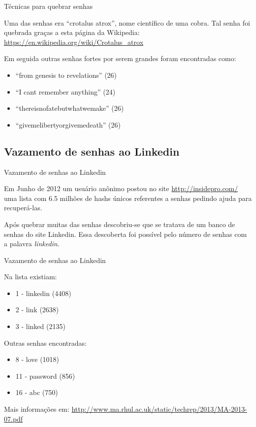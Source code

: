 \begin{frame}{Técnicas para quebrar senhas}

Uma das senhas era ``crotalus atrox'', nome científico de uma cobra. Tal
senha foi quebrada graças a esta página da Wikipedia:
\url{https://en.wikipedia.org/wiki/Crotalus_atrox}

Em seguida outras senhas fortes por serem grandes foram encontradas
como:

\begin{itemize}
\itemsep1pt\parskip0pt
\item
  ``from genesis to revelations'' (26)
\item
  ``I cant remember anything'' (24)
\item
  ``thereisnofatebutwhatwemake'' (26)
\item
  ``givemelibertyorgivemedeath'' (26)
\end{itemize}

\end{frame}

\subsection{Vazamento de senhas ao
Linkedin}\label{vazamento-de-senhas-ao-linkedin}

\begin{frame}{Vazamento de senhas ao Linkedin}

Em Junho de 2012 um usuário anônimo postou no site
\url{http://insidepro.com/} uma lista com 6.5 milhões de hashs únicos
referentes a senhas pedindo ajuda para recuperá-las.

Após quebrar muitas das senhas descobriu-se que se tratava de um banco
de senhas do site Linkedin. Essa descoberta foi possível pelo número de
senhas com a palavra \emph{linkedin}.

\end{frame}

\begin{frame}{Vazamento de senhas ao Linkedin}

Na lista existiam:

\begin{itemize}
\itemsep1pt\parskip0pt
\item
  1 - linkedin (4408)
\item
  2 - link (2638)
\item
  3 - linked (2135)
\end{itemize}

Outras senhas encontradas:

\begin{itemize}
\itemsep1pt\parskip0pt
\item
  8 - love (1018)
\item
  11 - password (856)
\item
  16 - abc (750)
\end{itemize}

Mais informações em:
\url{http://www.ma.rhul.ac.uk/static/techrep/2013/MA-2013-07.pdf}

\end{frame}

